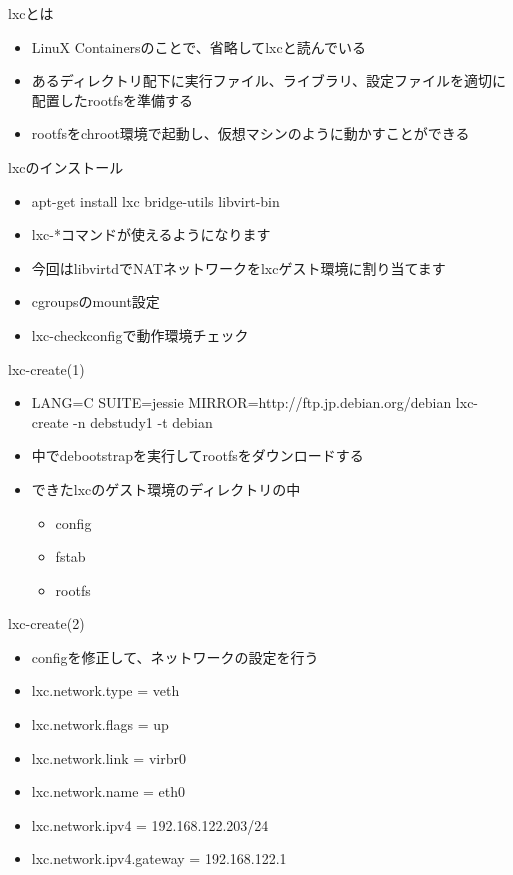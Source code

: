 
\begin{frame}[containsverbatim]{lxcとは}
  \begin{itemize}
  \item LinuX Containersのことで、省略してlxcと読んでいる
  \item あるディレクトリ配下に実行ファイル、ライブラリ、設定ファイルを適切に配置したrootfsを準備する
  \item rootfsをchroot環境で起動し、仮想マシンのように動かすことができる
  \end{itemize}
\end{frame}



\begin{frame}[containsverbatim]{lxcのインストール}
  \begin{itemize}
  \item apt-get install lxc bridge-utils libvirt-bin
  \item lxc-*コマンドが使えるようになります
  \item 今回はlibvirtdでNATネットワークをlxcゲスト環境に割り当てます
  \item cgroupsのmount設定
  \item lxc-checkconfigで動作環境チェック
  \end{itemize}
\end{frame}



\begin{frame}[containsverbatim]{lxc-create(1)}
  \begin{itemize}
  \item LANG=C SUITE=jessie MIRROR=http://ftp.jp.debian.org/debian lxc-create -n debstudy1 -t debian
  \item 中でdebootstrapを実行してrootfsをダウンロードする
  \item できたlxcのゲスト環境のディレクトリの中
    \begin{itemize}
    \item config
    \item fstab
    \item rootfs
    \end{itemize}
  \end{itemize}
\end{frame}

\begin{frame}[containsverbatim]{lxc-create(2)}
  \begin{itemize}
  \item configを修正して、ネットワークの設定を行う
  \item lxc.network.type = veth
  \item lxc.network.flags = up
  \item lxc.network.link = virbr0
  \item lxc.network.name = eth0
  \item lxc.network.ipv4 = 192.168.122.203/24
  \item lxc.network.ipv4.gateway = 192.168.122.1
  \end{itemize}
\end{frame}

